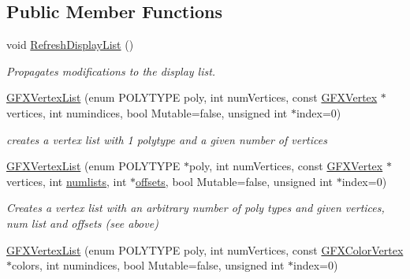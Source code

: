 \subsection*{Public Member Functions}
\begin{DoxyCompactItemize}
\item 
void \hyperlink{classGFXVertexList_a5887f1abe7988692a2df354816b6e06a}{Refresh\+Display\+List} ()\hypertarget{classGFXVertexList_a5887f1abe7988692a2df354816b6e06a}{}\label{classGFXVertexList_a5887f1abe7988692a2df354816b6e06a}

\begin{DoxyCompactList}\small\item\em Propagates modifications to the display list. \end{DoxyCompactList}\item 
\hyperlink{classGFXVertexList_a6f14bb2fb013285f9ef4adc83688c7b1}{G\+F\+X\+Vertex\+List} (enum P\+O\+L\+Y\+T\+Y\+PE poly, int num\+Vertices, const \hyperlink{structGFXVertex}{G\+F\+X\+Vertex} $\ast$vertices, int numindices, bool Mutable=false, unsigned int $\ast$index=0)\hypertarget{classGFXVertexList_a6f14bb2fb013285f9ef4adc83688c7b1}{}\label{classGFXVertexList_a6f14bb2fb013285f9ef4adc83688c7b1}

\begin{DoxyCompactList}\small\item\em creates a vertex list with 1 polytype and a given number of vertices \end{DoxyCompactList}\item 
\hyperlink{classGFXVertexList_af0c30a3d3f0387f27ebb38c7b27ff967}{G\+F\+X\+Vertex\+List} (enum P\+O\+L\+Y\+T\+Y\+PE $\ast$poly, int num\+Vertices, const \hyperlink{structGFXVertex}{G\+F\+X\+Vertex} $\ast$vertices, int \hyperlink{classGFXVertexList_a50b552e54f117f7456f3cb618c076190}{numlists}, int $\ast$\hyperlink{classGFXVertexList_a0310e1bd4dbc7bfb1240b200368ce8c9}{offsets}, bool Mutable=false, unsigned int $\ast$index=0)\hypertarget{classGFXVertexList_af0c30a3d3f0387f27ebb38c7b27ff967}{}\label{classGFXVertexList_af0c30a3d3f0387f27ebb38c7b27ff967}

\begin{DoxyCompactList}\small\item\em Creates a vertex list with an arbitrary number of poly types and given vertices, num list and offsets (see above) \end{DoxyCompactList}\item 
\hyperlink{classGFXVertexList_a4ef3c36add97917cf1b713de9b2eb7e6}{G\+F\+X\+Vertex\+List} (enum P\+O\+L\+Y\+T\+Y\+PE poly, int num\+Vertices, const \hyperlink{structGFXColorVertex}{G\+F\+X\+Color\+Vertex} $\ast$colors, int numindices, bool Mutable=false, unsigned int $\ast$index=0)\hypertarget{classGFXVertexList_a4ef3c36add97917cf1b713de9b2eb7e6}{}\label{classGFXVertexList_a4ef3c36add97917cf1b713de9b2eb7e6}


\end{DoxyCompactItemize}
